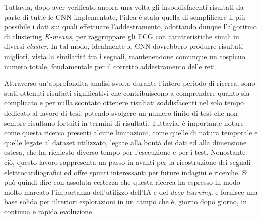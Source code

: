 \documentclass[12pt,italian]{report}
\newcommand\blankpage{%
    \null
    \thispagestyle{empty}%
    \addtocounter{page}{-1}%
    \newpage}
\begin{document}
	Tuttavia, dopo aver verificato ancora una volta gli insoddisfacenti risultati da parte di tutte le CNN implementate, l'idea è stata quella di semplificare il più possibile i dati sui quali effettuare l'addestramento, adottando dunque l'algoritmo di clustering \textit{K-means}, per raggruppare gli ECG con caratteristiche simili in diversi \textit{cluster}. In tal modo, idealmente le CNN dovrebbero produrre risultati migliori, vista la similarità tra i segnali, mantenendone comunque un cospicuo numero totale, fondamentale per il corretto addestramento delle reti.
	
	Attraverso un'approfondita analisi svolta durante l'intero periodo di ricerca, sono stati ottenuti risultati significativi che contribuiscono a comprendere quanto sia complicato e per nulla scontato ottenere risultati soddisfacenti nel solo tempo dedicato al lavoro di tesi, potendo svolgere un numero finito di test che non sempre risultano fortuiti in termini di risultati. Tuttavia, è importante notare come questa ricerca presenti alcune limitazioni, come quelle di natura temporale e quelle legate al dataset utilizzato, legate alla bontà dei dati ed alla dimensione estesa, che ha richiesto diverso tempo per l'esecuzione e per i test. Nonostante ciò, questo lavoro rappresenta un passo in avanti per la ricostruzione dei segnali elettrocardiografici ed offre spunti interessanti per future indagini e ricerche. Si può quindi dire con assoluta certezza che questa ricerca ha espresso in modo molto marcato l'importanza dell'utilizzo dell'IA e del \textit{deep learning}, e fornisce una base solida per ulteriori esplorazioni in un campo che è, giorno dopo giorno, in continua e rapida evoluzione.
	
	\afterpage{\blankpage}
	
	
	
	
	
	\afterpage{\blankpage}
	
\end{document}
